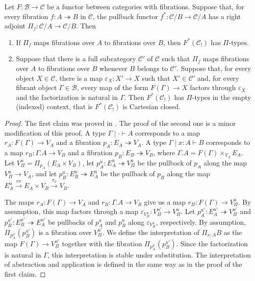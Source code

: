 \documentclass[reqno]{amsart}
\theoremstyle{definition}
\theoremstyle{remark}
\newcommand{\fs}[1]{\mathrm{#1}}
\newcommand{\scat}[1]{\mathcal{#1}}
\numberwithin{figure}{section}
\begin{document}
\begin{lem}
Let $F : \scat{B} \to \scat{C}$ be a functor between categories with fibrations.
Suppose that, for every fibration $f : A \twoheadrightarrow B$ in $\scat{C}$, the pullback functor $f^* : \scat{C}/B \to \scat{C}/A$ has a right adjoint $\Pi_f : \scat{C}/A \to \scat{C}/B$.
Then
\begin{enumerate}
\item If $\Pi_f$ maps fibrations over $A$ to fibrations over $B$, then $F^*(\scat{C}_!)$ has $\Pi$-types.
\item Suppose that there is a full subcategory $\scat{C}'$ of $\scat{C}$ such that $\Pi_f$ maps fibrations over $A$ to fibrations over $B$ whenever $B$ belongs to $\scat{C}'$.
Suppose that, for every object $X \in \scat{C}$, there is a map $\varepsilon_X : X' \to X$ such that $X' \in \scat{C}'$ and,
for every fibrant object $\Gamma \in \scat{B}$, every map of the form $F(\Gamma) \to X$ factors through $\varepsilon_X$ and the factorization is natural in $\Gamma$.
Then $F^*(\scat{C}_!)$ has $\Pi$-types in the empty (indexed) context, that is $F^*(\scat{C}_!)$ is Cartesian closed.
\end{enumerate}
\end{lem}
\begin{proof}
The first claim was proved in \cite{local-universes}.
The proof of the second one is a minor modification of this proof.
A type $\Gamma \mid \cdot \vdash A$ corresponds to a map $r_A : F(\Gamma) \to V_A$ and a fibration $p_A : E_A \twoheadrightarrow V_A$.
A type $\Gamma \mid x : A \vdash B$ corresponds to a map $r_B : \Gamma.A \to V_B$ and a fibration $p_B : E_B \twoheadrightarrow V_B$, where $\Gamma.A = F(\Gamma) \times_{V_A} E_A$.
Let $V_\Pi^u = \Pi_{p_A}(E_A \times V_B)$, let $p_A^u : E_A^u \twoheadrightarrow V_\Pi^u$ be the pullback of $p_A$ along the map $V_\Pi^u \to V_A$,
and let $p_B^u : E_B^u \twoheadrightarrow E_A^u$ be the pullback of $p_B$ along the map $E_A^u \xrightarrow{\fs{ev}} E_A \times V_B \xrightarrow{\pi_2} V_B$.

The maps $r_A : F(\Gamma) \to V_A$ and $r_B : \Gamma.A \to V_B$ give us a map $r_\Pi : F(\Gamma) \to V_\Pi^u$.
By assumption, this map factors through a map $\varepsilon_{V_\Pi^u} : V_\Pi^{u'} \to V_\Pi^u$.
Let $p_A^{u'} : E_A^{u'} \twoheadrightarrow V_\Pi^{u'}$ and $p_B^{u'} : E_B^{u'} \twoheadrightarrow E_A^{u'}$ be pullbacks of $p_A^u$ and $p_B^u$ along $\varepsilon_{V_\Pi^u}$, respectively.
By assumption, $\Pi_{p_A^{u'}}(p_B^{u'})$ is a fibration over $V_\Pi^{u'}$.
We define the interpretation of $\Pi_{x : A} B$ as the map $F(\Gamma) \to V_\Pi^{u'}$ together with the fibration $\Pi_{p_A^{u'}}(p_B^{u'})$.
Since the factorization is natural in $\Gamma$, this interpretation is stable under substitution.
The interpretation of abstraction and application is defined in the same way as in the proof of the first claim.
\end{proof}
\end{document}
